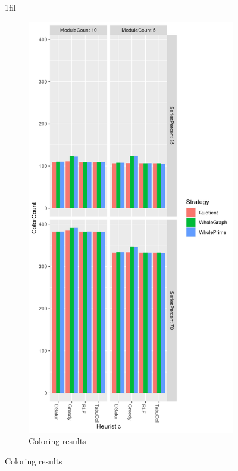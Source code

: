 \documentclass[a4paper]{article}
\makeatletter
\newcommand*{\centerfloat}{%
  \parindent \z@
  \leftskip \z@ \@plus 1fil \@minus \textwidth
  \rightskip\leftskip
  \parfillskip \z@skip}
\makeatother
\begin{document}
\begin{figure}
\centerfloat
    \begin{subfigure}{.5\paperwidth}
        \includegraphics[width=\columnwidth]{Tables/1000.png}
      \caption{Coloring results}
      \label{fig:1000c}

\end{subfigure}
\end{figure}
\end{document}
